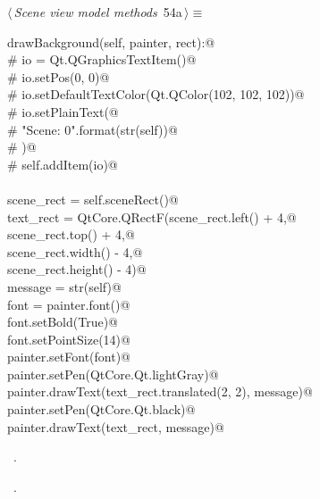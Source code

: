 \documentclass[
    a4paper,      %
    10pt,         %
    openright,    %
    notitlepage,  %
    parskip=half, %
]{scrreprt}       %
\theoremstyle{definition}                    %
\begin{document}
\begin{flushleft} \small
\begin{minipage}{\linewidth}\label{scrap82}\raggedright\small
{} $\langle\,${\itshape Scene view model methods}\nobreak\ {\footnotesize {54a}}$\,\rangle\equiv$
\vspace{-1exm}
\begin{list}{}{} \item
\mbox{}\lstinline@def drawBackground(self, painter, rect):@\\
\mbox{}\lstinline@    # io = Qt.QGraphicsTextItem()@\\
\mbox{}\lstinline@    # io.setPos(0, 0)@\\
\mbox{}\lstinline@    # io.setDefaultTextColor(Qt.QColor(102, 102, 102))@\\
\mbox{}\lstinline@    # io.setPlainText(@\\
\mbox{}\lstinline@    #     "Scene: {0}".format(str(self))@\\
\mbox{}\lstinline@    # )@\\
\mbox{}\lstinline@    # self.addItem(io)@\\
\mbox{}\lstinline@@\\
\mbox{}\lstinline@    scene_rect = self.sceneRect()@\\
\mbox{}\lstinline@    text_rect = QtCore.QRectF(scene_rect.left()   + 4,@\\
\mbox{}\lstinline@                              scene_rect.top()    + 4,@\\
\mbox{}\lstinline@                              scene_rect.width()  - 4,@\\
\mbox{}\lstinline@                              scene_rect.height() - 4)@\\
\mbox{}\lstinline@    message = str(self)@\\
\mbox{}\lstinline@    font = painter.font()@\\
\mbox{}\lstinline@    font.setBold(True)@\\
\mbox{}\lstinline@    font.setPointSize(14)@\\
\mbox{}\lstinline@    painter.setFont(font)@\\
\mbox{}\lstinline@    painter.setPen(QtCore.Qt.lightGray)@\\
\mbox{}\lstinline@    painter.drawText(text_rect.translated(2, 2), message)@\\
\mbox{}\lstinline@    painter.setPen(QtCore.Qt.black)@\\
\mbox{}\lstinline@    painter.drawText(text_rect, message)@{\NWsep}
\end{list}
\vspace{-1.5ex}
\footnotesize
\begin{list}{}{\setlength{\itemsep}{-\parsep}\setlength{\itemindent}{-\leftmargin}}
\item \NWtxtMacroDefBy\ .
\item \NWtxtMacroRefIn\ .

\item{}
\end{list}
\end{minipage}\vspace{4ex}
\end{flushleft}
\end{document}
